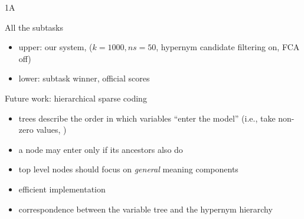 \documentclass{beamer}
\newlength{\onecolwid}
\newcommand{\bull}[1]{
  \begin{itemize}
    \item #1
  \end{itemize}
}
\begin{document}
\begin{frame}[t]
\begin{columns}[t]
\begin{column}{\onecolwid}
\begin{block}{1A}


    \end{block}
      \begin{block}{All the subtasks}

        

        \begin{itemize}
          \item upper: our system, ($k = 1000, ns = 50$, hypernym candidate
            filtering on, FCA off) 
          \item lower: subtask winner, official scores 
        \end{itemize}


      \end{block}

  \begin{block}{Future work: hierarchical sparse coding}
    \begin{itemize}
      \item trees describe the order in which variables “enter the model”
        (i.e., take non-zero values, \cite{Zhao:2009})
      \item a node may enter only if its ancestors also do
      \item %
        top level nodes should focus on \emph{general} meaning components
      \item efficient implementation \citep{Yogatama:2015}
      \item correspondence between
        the variable tree and the hypernym hierarchy
    \end{itemize}


\end{block}
\end{column}
\end{columns}
\end{frame}
\end{document}
